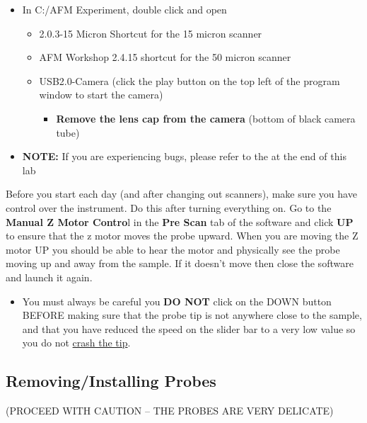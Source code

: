 \documentclass{../lab}
\begin{document}
\begin{itemize}
    \item In C:/AFM Experiment, double click and open
    \begin{itemize}
        \item 2.0.3-15 Micron Shortcut for the 15 micron scanner

        \item AFM Workshop 2.4.15 shortcut for the 50 micron scanner

        \item USB2.0-Camera (click the play button on the top left of the program window to start the camera)

        \begin{itemize}
            \item \textbf{Remove the lens cap from the camera }(bottom of black camera tube)

        \end{itemize}

    \end{itemize}

    \item \textbf{NOTE:} If you are experiencing bugs, please refer to the \textbf{} at the end of this lab

\end{itemize}

Before you start each day (and after changing out scanners), make sure you have control over the instrument. Do this after turning everything on. Go to the \textbf{Manual Z Motor Contro}l in the \textbf{Pre Scan} tab of the software and click \textbf{UP} to ensure that the z motor moves the probe upward.  When you are moving the Z motor UP you should be able to hear the motor and physically see the probe moving up and away from the sample.  If it doesn’t move then close the software and launch it again.

\begin{itemize}
    \item You must always be careful you \textbf{DO NOT} click on the DOWN button BEFORE making sure that the probe tip is not anywhere close to the sample, and that you have reduced the speed on the slider bar to a very low value so you do not \hyperref[subsec:BrokenTip]{crash the tip}.

\end{itemize}

\subsection{Removing/Installing Probes} (PROCEED WITH CAUTION -- THE PROBES ARE VERY DELICATE)
\end{document}

